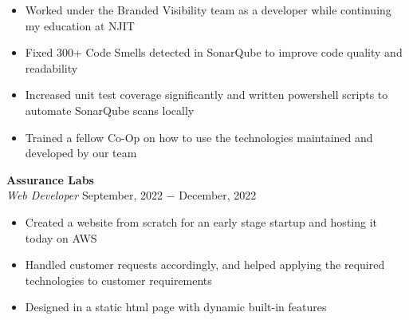 \documentclass{article}
\begin{document}
\begin{itemize}[noitemsep,nolistsep,leftmargin=*]
\item {Worked under the Branded Visibility team as a developer while continuing my education at NJIT}
\item {Fixed 300+ Code Smells detected in SonarQube to improve code quality and readability}
\item {Increased unit test coverage significantly and written powershell scripts to automate SonarQube scans locally}
\item {Trained a fellow Co-Op on how to use the technologies maintained and developed by our team}\\
\end{itemize}

\noindent \textbf{Assurance Labs} \\
\textit{Web Developer} \hfill September, 2022 $-$ December, 2022
\begin{itemize}[noitemsep,nolistsep,leftmargin=*]
\item {Created a website from scratch for an early stage startup and hosting it today on AWS}
\item {Handled customer requests accordingly, and helped applying the required technologies to customer requirements}
\item {Designed in a static html page with dynamic built-in features\\}
\end{itemize}



\end{document}

